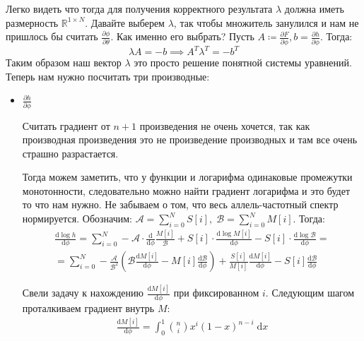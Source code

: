 \documentclass[10pt]{article}
\theoremstyle{plain}
\theoremstyle{remark}
\newcommand{\R}{\mathbb{R}}
\begin{document}
Легко видеть что тогда для получения корректного результата $\lambda$ должна иметь размерность $\R^{1 \times N}$.
Давайте выберем $\lambda$, так чтобы множитель занулился и нам не пришлось бы считать $\frac{\partial \phi}{\partial \theta}$. Как именно его выбрать?
Пусть $A \coloneqq \frac{\partial F}{\partial \phi}, b = \frac{\partial h}{\partial \phi}$. Тогда:
\begin{equation*}
  \lambda A = -b \implies A^T \lambda^T = -b^T
\end{equation*}
Таким образом наш вектор $\lambda$ это просто решение понятной системы уравнений. Теперь нам нужно посчитать три производные:

\begin{itemize}
  \item $\boxed{\frac{\partial h}{\partial \phi}}$

  Считать градиент от $n + 1$  произведения не очень хочется, так как производная произведения это не
  произведение производных и там все очень страшно разрастается.

  Тогда можем заметить, что у функции и логарифма одинаковые промежутки монотонности, следовательно можно найти градиент логарифма и это будет то что нам нужно.
  Не забываем о том, что весь аллель-частотный спектр нормируется. Обозначим: $\mathcal{A} = \sum_{i = 0}^N S[i],\; \mathcal{B} = \sum_{i = 0}^N M[i]$. Тогда:
  \begin{gather*}
    \frac{\mathrm{d} \log h}{\mathrm{d} \phi} = \sum_{i = 0}^N -\mathcal{A} \cdot \frac{\mathrm{d}}{\mathrm{d}\phi} \frac{M[i]}{\mathcal{B}} + 
    S[i] \cdot \frac{\mathrm{d} \log M[i]}{\mathrm{d} \phi} - S[i] \cdot \frac{\mathrm{d}\log \mathcal{B}}{\mathrm{d}\phi} = \\ =
    \sum_{i = 0}^N -\frac{\mathcal{A}}{\mathcal{B}^2} \left(\mathcal{B} \frac{\mathrm{d} M[i]}{\mathrm{d} \phi} - M[i] \frac{\mathrm{d} \mathcal{B}}{\mathrm{d}\phi} \right) +
    \frac{S[i]}{M[i]} \frac{\mathrm{d}M[i]}{\mathrm{d}\phi} - S[i] \frac{\mathrm{d} \mathcal{B}}{\mathrm{d}\phi}
  \end{gather*}
  
  Свели задачу к нахождению $\frac{\mathrm{d} M[i]}{\mathrm{d} \phi}$ при фиксированном  $i$. Следующим шагом проталкиваем градиент внутрь $M$:
  \begin{gather*}
    \frac{\mathrm{d} M[i]}{\mathrm{d} \phi} = 
    \int_0^1
    \binom{n}{i} x^{i} (1 - x)^{n - i}  \; \mathrm{d}x
  \end{gather*}
  

\end{itemize}
\end{document}

